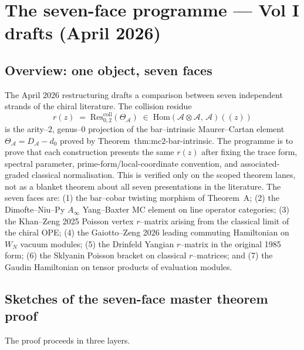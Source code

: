 \documentclass[11pt]{article}
\newcommand{\cA}{\mathcal{A}}
\begin{document}
\section{The seven-face programme --- Vol I drafts (April 2026)}
\label{sec:seven-faces-vol1-drafts}


\subsection{Overview: one object, seven faces}

The April 2026 restructuring drafts a comparison between seven independent
strands of the chiral literature.  The collision residue
\[
  r(z) \;=\; \mathrm{Res}^{\mathrm{coll}}_{0,2}(\Theta_\cA)
  \;\in\; \mathrm{Hom}(\cA \otimes \cA,\, \cA)((z))
\]
is the arity--$2$, genus--$0$ projection of the bar--intrinsic Maurer--Cartan
element $\Theta_\cA = D_\cA - d_0$ proved by
Theorem~\textup{thm:mc2-bar-intrinsic}.  The programme is to prove
that each construction presents the same $r(z)$ after fixing the
trace form, spectral parameter, prime-form/local-coordinate
convention, and associated-graded classical normalisation.  This is
verified only on the scoped theorem lanes, not as a blanket theorem
about all seven presentations in the literature.  The seven faces
are: (1) the bar--cobar twisting morphism of
Theorem~A; (2) the Dimofte--Niu--Py $A_\infty$ Yang--Baxter MC element on
line operator categories; (3) the Khan--Zeng 2025 Poisson vertex
$r$--matrix arising from the classical limit of the chiral OPE;
(4) the Gaiotto--Zeng 2026 leading commuting Hamiltonian on $W_N$ vacuum
modules; (5) the Drinfeld Yangian $r$--matrix in the original 1985 form;
(6) the Sklyanin Poisson bracket on classical $r$--matrices; and (7) the
Gaudin Hamiltonian on tensor products of evaluation modules.

\subsection{Sketches of the seven-face master theorem proof}

The proof proceeds in three layers.
\end{document}
